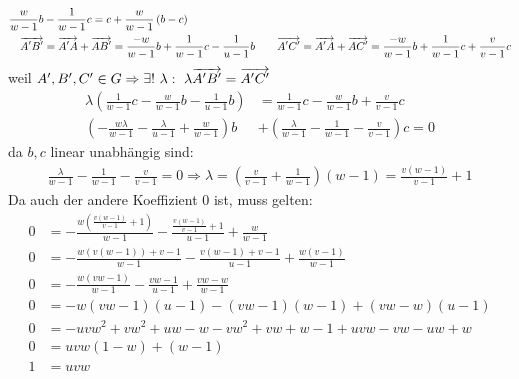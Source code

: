\begin{mysatz}
\begin{align*}
        \frac{w}{w-1} b & - \frac{1}{w-1} c = c + \frac{w}{w-1} \left( b-c \right)\\
        \overrightarrow{A'B'} & = \overrightarrow{A'A} + \overrightarrow{AB'} = \frac{-w}{w-1} b + \frac{1}{w-1} c - \frac{1}{u-1} b \qquad \overrightarrow{A'C'} = \overrightarrow{A'A} + \overrightarrow{AC'} = \frac{-w}{w-1} b + \frac{1}{w-1} c + \frac{v}{v-1} c
    \end{align*}
    weil $A',B',C' \in G \Rightarrow \exists !\ \lambda :\ \lambda \overrightarrow{A'B'} = \overrightarrow{A'C'}$
    \begin{align*}
        \lambda \left( \frac{1}{w-1}c - \frac{w}{w-1}b - \frac{1}{u-1}b \right) & = \frac{1}{w-1}c - \frac{w}{w-1}b + \frac{v}{v-1}c\\
        \left( -\frac{w \lambda}{w-1} - \frac{\lambda}{u-1} + \frac{w}{w-1} \right)b & + \left( \frac{\lambda}{w-1} - \frac{1}{w-1} - \frac{v}{v-1} \right)c = 0
    \end{align*}
    da $b,c$ linear unabhängig sind:
    \begin{align*}
        \frac{\lambda}{w-1} - \frac{1}{w-1} - \frac{v}{v-1} = 0 \Rightarrow \lambda = \left( \frac{v}{v-1} + \frac{1}{w-1} \right)(w-1) = \frac{v(w-1)}{v-1} +1
    \end{align*}
    Da auch der andere Koeffizient 0 ist, muss gelten:
    \begin{align*}
        0 & = - \frac{w \left( \frac{v(w-1)}{v-1} + 1 \right)}{w-1} - \frac{\frac{v(w-1)}{v-1}+1}{u-1} + \frac{w}{w-1}\\
        0 & = - \frac{w(v(w-1))+ v-1}{w-1} - \frac{v(w-1)+v-1}{u-1} + \frac{w(v-1)}{w-1}\\
        0 & = - \frac{w(vw-1)}{w-1} - \frac{vw-1}{u-1} + \frac{vw-w}{w-1}\\
        0 & = -w(vw-1)(u-1) - (vw-1)(w-1) + (vw-w)(u-1)\\
        0 & = -uvw^2+vw^2+uw-w-vw^2+vw+w-1+uvw-vw-uw+w\\
        0 & = uvw(1-w)+(w-1)\\
        1 & = uvw
    \end{align*}
\end{mysatz}

